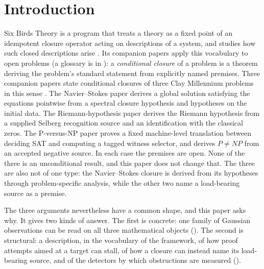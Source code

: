 \section{Introduction}\label{sec:intro}

Six Birds Theory is a program that treats a theory as a fixed point of
an idempotent closure operator acting on descriptions of a system, and
studies how such closed descriptions arise
\cite{Tsiokos2026EmergenceCalculus}.  Its companion papers apply this
vocabulary to open problems (a glossary is in
): a \emph{conditional closure} of
a problem is a theorem deriving the problem's standard statement from
explicitly named premises.  Three companion papers state conditional
closures of three Clay Millennium problems in this sense
\cite{Fefferman2000NavierStokes,Bombieri2000Riemann,Cook2000PvsNP,CarlsonJaffeWiles2006MillenniumPrize}.
The Navier--Stokes paper \cite{Tsiokos2026NavierStokes} derives a
global solution satisfying the equations pointwise from a spectral
closure hypothesis and hypotheses on the initial data.  The Riemann-hypothesis paper
\cite{Tsiokos2026RH} derives the Riemann hypothesis from a supplied
Selberg recognition source and an identification with the classical
zeros.  The P-versus-NP paper \cite{Tsiokos2026PvNP} proves a fixed
machine-level translation between deciding SAT and computing a tagged
witness selector, and derives \(P\neq NP\) from an accepted negative
source.  In each case the premises are open.  None of the three is an
unconditional result, and this paper does not change that.  The three
are also not of one type: the Navier--Stokes closure is derived from its
hypotheses through problem-specific analysis, while the other two name
a load-bearing source as a premise.

The three arguments nevertheless have a common shape, and this paper
asks why.  It gives two kinds of answer.  The first is concrete: one
family of Gaussian observations can be read on all three mathematical
objects ().  The second is
structural: a description, in the vocabulary of the framework, of how
proof attempts aimed at a target can stall, of how a closure can instead
name its load-bearing source, and of the detectors by which obstructions
are measured ().


